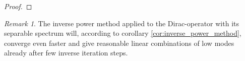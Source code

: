 \documentclass{article}
\theoremstyle{plain} %
\newtheorem{theorem}{Theorem}[section]
\theoremstyle{convention} %
\theoremstyle{remark} %
\newtheorem*{remark}{Remark} %
\numberwithin{equation}{section}
\begin{document}
\begin{appendix}
\begin{proof}
\end{proof}

\begin{remark}
  The inverse power method applied to the Dirac-operator with its separable spectrum will, according to corollary \ref{cor:inverse_power_method}, converge even faster and give reasonable linear combinations of low modes already after few inverse iteration steps.
\end{remark}

\end{appendix}
\end{document}
